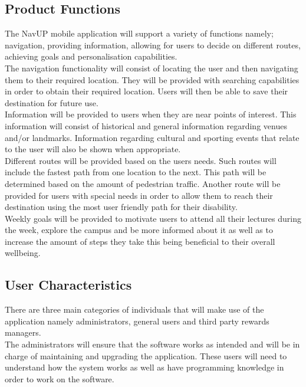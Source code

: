 \documentclass[11pt, a4paper]{article}
\begin{document}
	\subsection{Product Functions}
	The NavUP mobile application will support a variety of functions namely; navigation,  providing information,  allowing for users to decide on different routes,  achieving goals and personalisation capabilities.
	\\

	The navigation functionality will consist of locating the user and then navigating them to their required location. They will be provided with searching capabilities in order to obtain their required location. Users will then be able to save their destination for future use.
	\\

	Information will be provided to users when they are near points of interest. This information will consist of historical and general information regarding venues and/or landmarks. Information regarding cultural and sporting events that relate to the user will also be shown when appropriate.
	\\

	Different routes will be provided based on the users needs. Such routes will include the fastest path from one location to the next. This path will be determined based on the amount of pedestrian traffic. Another route will be provided for users with special needs in order to allow them to reach their destination using the most user friendly path for their disability.
	\\

	Weekly goals will be provided to motivate users to attend all their lectures during the week,  explore the campus and be more informed about it as well as to increase the amount of steps they take this being beneficial to their overall wellbeing.

	\subsection{User Characteristics}
	There are three main categories of individuals that will make use of the application namely administrators,  general users and third party rewards managers.
	\\


	The administrators will ensure that the software works as intended and will be in charge of maintaining and upgrading the application. These users will need to understand how the system works as well as have programming knowledge in order to work on the software.
	\\
\end{document}

